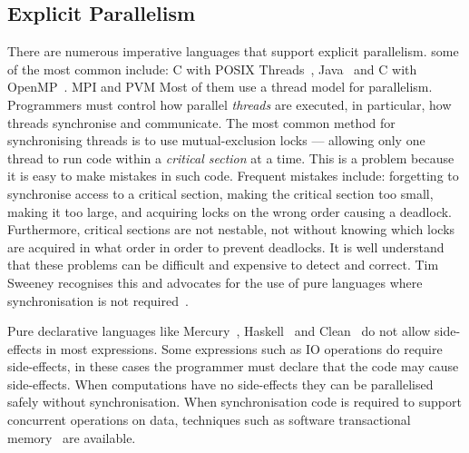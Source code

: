 
%

\subsection{Explicit Parallelism}
\label{sec:back_par_explicit}

There are numerous imperative languages that support explicit
parallelism.
some of the most common include:
C with POSIX Threads~\cite{pthreads},
Java~\cite{java} and C with OpenMP~\cite{openmp}.
MPI and PVM
Most of them use a thread model for parallelism.
Programmers must control how parallel \emph{threads} are executed,
in particular, how threads synchronise and communicate.
The most common method for synchronising threads is to use
mutual-exclusion locks --- allowing only one thread to run code within
a \emph{critical section} at a time.
This is a problem because it is easy to make mistakes in such code.
Frequent mistakes include: forgetting to synchronise access to a critical
section, making the critical section too small, making it
too large, and acquiring locks on the wrong order causing a deadlock.
Furthermore, critical sections are not nestable, not without
knowing which locks are acquired in what order in order to prevent
deadlocks.
It is well understand that these problems can be difficult and
expensive to detect and correct.
Tim Sweeney recognises this and advocates for the use of pure
languages where synchronisation is not
required~\cite{sweeney:2009:end_gpu_roadmap}.


Pure declarative languages like Mercury~\cite{mercury-jlp},
Haskell~\cite{haskell98} and Clean~\cite{1991:concurrent-clean} do not
allow side-effects in most expressions.
Some expressions such as IO operations do require side-effects, in
these cases the programmer must declare that the code may cause
side-effects.
When computations have no side-effects they can be parallelised safely
without synchronisation.
When synchronisation code is required to support concurrent operations
on data, techniques such as software transactional
memory~\cite{harris_marlow_spj:haskell-stm, mika:mercury-stm} are
available.

